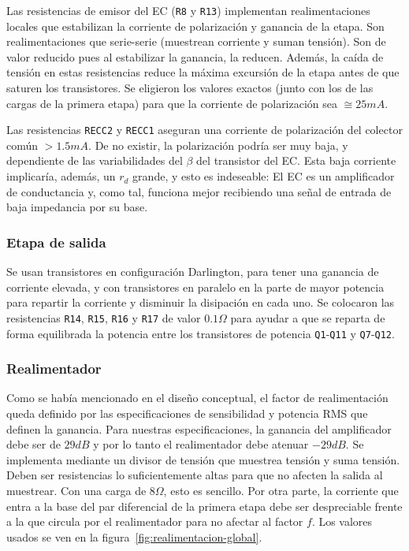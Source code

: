 \documentclass[a4paper,12pt,twoside]{article}
\begin{document}
Las resistencias de emisor del EC (\texttt{R8} y \texttt{R13}) implementan realimentaciones locales que estabilizan la corriente de polarización y ganancia de la etapa. Son realimentaciones que serie-serie (muestrean corriente y suman tensión). Son de valor reducido pues al estabilizar la ganancia, la reducen. Además, la caída de tensión en estas resistencias reduce la máxima excursión de la etapa antes de que saturen los transistores. Se eligieron los valores exactos (junto con los de las cargas de la primera etapa) para que la corriente de polarización sea $\cong 25mA$.

Las resistencias \texttt{RECC2} y \texttt{RECC1} aseguran una corriente de polarización del colector común $>1.5mA$. De no existir, la polarización podría ser muy baja, y dependiente de las variabilidades del $\beta$ del transistor del EC. Esta baja corriente implicaría, además, un $r_d$ grande, y esto es indeseable: El EC es un amplificador de conductancia y, como tal, funciona mejor recibiendo una señal de entrada de baja impedancia por su base.


\subsubsection{Etapa de salida}

Se usan transistores en configuración Darlington, para tener una ganancia de corriente elevada, y con transistores en paralelo en la parte de mayor potencia para repartir la corriente y disminuir la disipación en cada uno. Se colocaron las resistencias \texttt{R14}, \texttt{R15}, \texttt{R16} y \texttt{R17} de valor $0.1\Omega$ para ayudar a que se reparta de forma equilibrada la potencia entre los transistores de potencia \texttt{Q1}-\texttt{Q11} y \texttt{Q7}-\texttt{Q12}.

\subsubsection{Realimentador}

Como se había mencionado en el diseño conceptual, el factor de realimentación queda definido por las especificaciones de sensibilidad y potencia RMS que definen la ganancia. Para nuestras especificaciones, la ganancia del amplificador debe ser de $29dB$ y por lo tanto el realimentador debe atenuar $-29dB$. Se implementa mediante un divisor de tensión que muestrea tensión y suma tensión. Deben ser resistencias lo suficientemente altas para que no afecten la salida al muestrear. Con una carga de $8\Omega$, esto es sencillo. Por otra parte, la corriente que entra a la base del par diferencial de la primera etapa debe ser despreciable frente a la que circula por el realimentador para no afectar al factor $f$. Los valores usados se ven en la figura~\ref{fig:realimentacion-global}.
\end{document}

